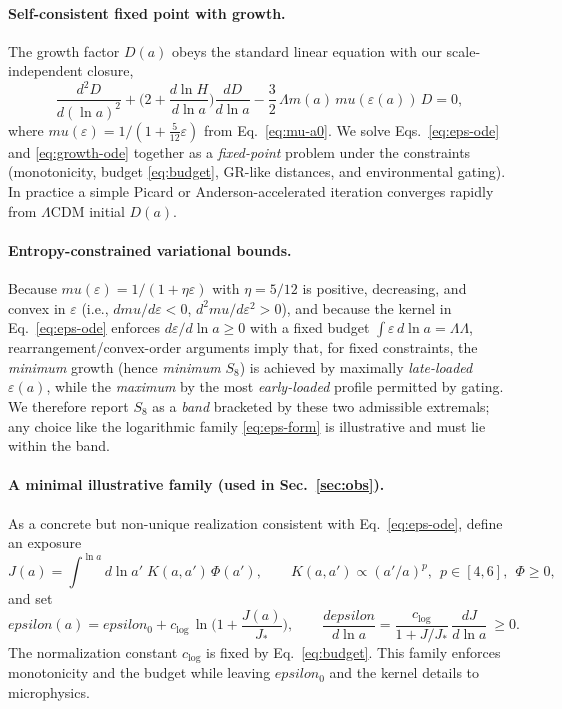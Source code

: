 \documentclass[aps,prd,onecolumn,superscriptaddress,nofootinbib]{revtex4-2}
\def\eps{epsilon}%
\def\mu{mu}%
\def\Omega_\Lambda{OmegaLambda}%
\providecommand{\eps}{\varepsilon}
\begin{document}
\paragraph{Self-consistent fixed point with growth.}
The growth factor \(D(a)\) obeys the standard linear equation with our scale-independent closure,
\begin{equation}
\label{eq:growth-ode}
\frac{d^2 D}{d(\ln a)^2}
+\Big(2+\frac{d\ln H}{d\ln a}\Big)\frac{dD}{d\ln a}
-\frac{3}{2}\,\Omega_m(a)\,\mu(\varepsilon(a))\,D=0,
\end{equation}
where \(\mu(\varepsilon)=1/(1+\tfrac{5}{12}\varepsilon)\) from Eq.~\eqref{eq:mu-a0}. We solve Eqs.~\eqref{eq:eps-ode} and \eqref{eq:growth-ode} together as a \emph{fixed-point} problem under the constraints (monotonicity, budget \eqref{eq:budget}, GR-like distances, and environmental gating). In practice a simple Picard or Anderson-accelerated iteration converges rapidly from \(\Lambda\)CDM initial \(D(a)\).

\paragraph{Entropy-constrained variational bounds.}
Because \(\mu(\varepsilon)=1/(1+\eta\varepsilon)\) with \(\eta=5/12\) is positive, decreasing, and convex in \(\varepsilon\) (i.e., \(d\mu/d\varepsilon<0\), \(d^2\mu/d\varepsilon^2>0\)), and because the kernel in Eq.~\eqref{eq:eps-ode} enforces \(d\varepsilon/d\ln a\ge 0\) with a fixed budget \(\int\varepsilon\,d\ln a=\Omega_\Lambda\), rearrangement/convex-order arguments imply that, for fixed constraints, the \emph{minimum} growth (hence \emph{minimum} \(S_8\)) is achieved by maximally \emph{late-loaded} \(\varepsilon(a)\), while the \emph{maximum} by the most \emph{early-loaded} profile permitted by gating. We therefore report \(S_8\) as a \emph{band} bracketed by these two admissible extremals; any choice like the logarithmic family \eqref{eq:eps-form} is illustrative and must lie within the band.

\paragraph{A minimal illustrative family (used in Sec.~\ref{sec:obs}).}
As a concrete but non-unique realization consistent with Eq.~\eqref{eq:eps-ode}, define an exposure
\begin{equation}
\label{eq:Jdef}
J(a)=\int^{\ln a}\! d\ln a'\; K(a,a')\, \Phi(a'),\qquad K(a,a')\propto (a'/a)^p,\ \ p\in[4,6],\ \ \Phi\ge 0,
\end{equation}
and set
\begin{equation}
\label{eq:eps-form}
\eps(a)=\eps_0+c_{\log}\,\ln\!\Big(1+\frac{J(a)}{J_*}\Big),\qquad \frac{d\eps}{d\ln a}=\frac{c_{\log}}{1+J/J_*}\,\frac{dJ}{d\ln a}\ \ge 0.
\end{equation}
The normalization constant \(c_{\log}\) is fixed by Eq.~\eqref{eq:budget}. This family enforces monotonicity and the budget while leaving \(\eps_0\) and the kernel details to microphysics.
\end{document}
